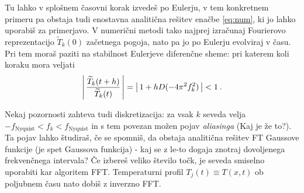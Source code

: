 \documentclass{article}
\begin{document}
\bigskip

Tu lahko v splošnem časovni korak izvedeš po Eulerju, v tem konkretnem primeru
pa obstaja tudi enostavna analitična rešitev enačbe \ref{eq:num}, ki jo lahko uporabiš za primerjavo.
V numerični metodi tako najprej izračunaj Fourierovo reprezentacijo $\widetilde{T}_k(0)$
začetnega pogoja, nato pa jo po Eulerju evolviraj v času.
Pri tem moraš paziti na stabilnost Eulerjeve diferenčne sheme:
pri katerem koli koraku mora veljati
\begin{equation*}
\left\vert \,
{\widetilde{T}_k(t+h)\over \widetilde{T}_k(t)} \,\right\vert
= \left\vert\, 1 + hD(-4\pi^2 f_k^2)\, \right\vert < 1 \>.
\end{equation*}

Nekaj pozornosti zahteva tudi diskretizacija: za vsak $k$
seveda velja  $-f_\mathrm{Nyquist} < f_k < f_\mathrm{Nyquist}$ in s tem povezan
mo\v zen pojav \emph{aliasinga} (Kaj je že to?). Ta pojav lahko \v studira\v s,
\v ce se spomni\v s, da obstaja analiti\v cna re\v sitev FT Gaussove funkcije (je spet Gaussova funkcija) - kaj se z le-to dogaja znotraj dovoljenega frekvenčnega intervala?
\v Ce izbereš veliko število točk, je seveda smiselno uporabiti kar algoritem FFT.
Temperaturni profil $T_j(t)\equiv T(x,t)$ ob poljubnem času
nato dobiš z inverzno FFT.

\bigskip
\end{document}
